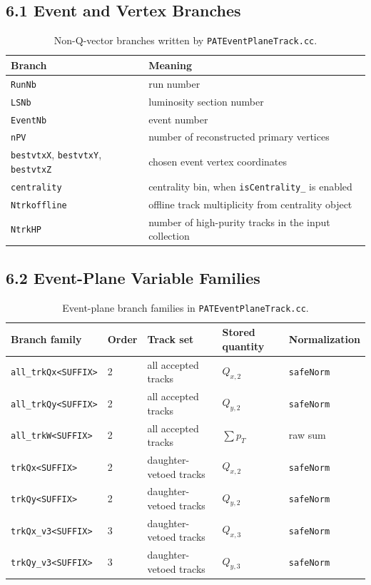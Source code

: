 \documentclass[11pt]{article}
\begin{document}
\subsection*{6.1 Event and Vertex Branches}

\begin{table}[h]
\centering
\small
\begin{tabular}{ll}
\toprule
Branch & Meaning \\
\midrule
\texttt{RunNb} & run number \\
\texttt{LSNb} & luminosity section number \\
\texttt{EventNb} & event number \\
\texttt{nPV} & number of reconstructed primary vertices \\
\texttt{bestvtxX}, \texttt{bestvtxY}, \texttt{bestvtxZ} & chosen event vertex coordinates \\
\texttt{centrality} & centrality bin, when \texttt{isCentrality\_} is enabled \\
\texttt{Ntrkoffline} & offline track multiplicity from centrality object \\
\texttt{NtrkHP} & number of high-purity tracks in the input collection \\
\bottomrule
\end{tabular}
\caption{Non-Q-vector branches written by \texttt{PATEventPlaneTrack.cc}.}
\label{tab:patep-event-branches}
\end{table}

\subsection*{6.2 Event-Plane Variable Families}

\begin{table}[h]
\centering
\small
\begin{tabular}{lllll}
\toprule
Branch family & Order & Track set & Stored quantity & Normalization \\
\midrule
\texttt{all\_trkQx<SUFFIX>} & 2 & all accepted tracks & $Q_{x,2}$ & \texttt{safeNorm} \\
\texttt{all\_trkQy<SUFFIX>} & 2 & all accepted tracks & $Q_{y,2}$ & \texttt{safeNorm} \\
\texttt{all\_trkW<SUFFIX>}  & 2 & all accepted tracks & $\sum p_{T}$ & raw sum \\
\texttt{trkQx<SUFFIX>}      & 2 & daughter-vetoed tracks & $Q_{x,2}$ & \texttt{safeNorm} \\
\texttt{trkQy<SUFFIX>}      & 2 & daughter-vetoed tracks & $Q_{y,2}$ & \texttt{safeNorm} \\
\texttt{trkQx\_v3<SUFFIX>}  & 3 & daughter-vetoed tracks & $Q_{x,3}$ & \texttt{safeNorm} \\
\texttt{trkQy\_v3<SUFFIX>}  & 3 & daughter-vetoed tracks & $Q_{y,3}$ & \texttt{safeNorm} \\
\bottomrule
\end{tabular}
\caption{Event-plane branch families in \texttt{PATEventPlaneTrack.cc}.}
\label{tab:patep-variable-families}
\end{table}
\end{document}
